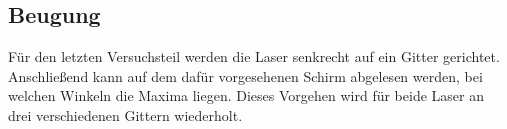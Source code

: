 \subsection{Beugung}
Für den letzten Versuchsteil werden die Laser senkrecht auf ein Gitter gerichtet. Anschließend kann auf dem dafür vorgesehenen Schirm abgelesen werden, bei welchen Winkeln die Maxima liegen. Dieses Vorgehen wird für beide Laser an drei verschiedenen Gittern wiederholt. 
